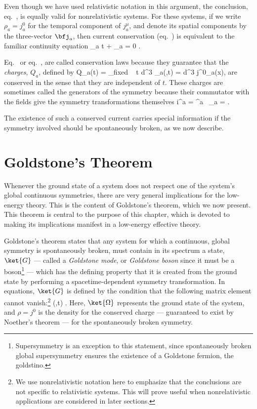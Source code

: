 \documentclass[12pt]{report}
\begin{document}
Even though we have used relativistic notation in this
argument, the  conclusion, eq.~, is
equally valid for nonrelativistic systems. For these
systems, if we write $\rho_a = 
j^0_a$ for the temporal component of $j^\mu_a$, and denote
its spatial components by the three-vector $\bfj_a$, then
current conservation (eq.~) is
equivalent to the familiar continuity equation
%
\eq
\label{noethersthm}
{ \partial \rho_a \over \partial t} + \nabla \cdot \bfj_a =
0 .
\eeq

Eq.~ or eq.~, are
called conservation laws because they guarantee that the
{\em charges}, $Q_a$, defined by
%
\eq
\label{chargint}
Q_a(t) = \int_{{\rm fixed} ~ t} d^3\bfr \; \rho_a(\bfr,t) =
\int d^3\bfr \;
j^0_a(x),
\eeq
%
are conserved in the sense that they are independent of
$t$. These charges are sometimes called the generators of
the symmetry because their commutator with the fields give
the symmetry transformations themselves  
%
\eq
\label{gencondition}
i\omega^a \; [Q_a, \phi(x) ] = \omega^a \, \xi_a = \delta
\phi.
\eeq

The existence of such a conserved current carries special
information if the symmetry involved should be
spontaneously broken, as we now describe.

\section{Goldstone's Theorem}

Whenever the ground state of a system does not respect one
of the system's global continuous symmetries, there are
very general implications for the low-energy theory. This
is the content of Goldstone's theorem, which we now
present. This theorem is central to the purpose of this
chapter, which is devoted to making its implications
manifest in a low-energy effective theory.

Goldstone's theorem states that any system for which a
continuous, global symmetry is spontaneously broken, must
contain in its spectrum a state, $\ket{G} $ --- called a
{\em Goldstone mode}, or {\em Goldstone boson} since it
must be a boson\footnote{Supersymmetry is an exception to
this statement, since spontaneously broken global
supersymmetry ensures the existence of a Goldstone fermion,
the goldstino.} --- which has the defining property that it
is created from the ground state by performing a
spacetime-dependent symmetry transformation. In equations,
$\ket{G}$ is defined by the condition that the following
matrix element cannot vanish:\footnote{We use
nonrelativistic notation here to emphasize that the
conclusions are not specific to relativistic systems. This
will prove useful when nonrelativistic applications are
considered in later sections.}
%
\eq
\label{gbdefn}
 \rho(\bfr,t) \ket{\Omega}  . \eeq
%
Here, $\ket{\Omega}$ represents the ground state of the
system, and $\rho = j^0$ is the density for the conserved
charge --- guaranteed to exist by Noether's theorem --- for
the spontaneously broken symmetry. 
\end{document}
